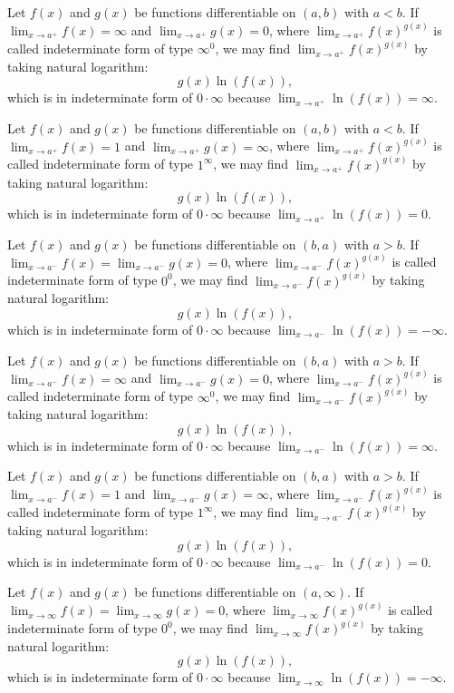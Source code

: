 \documentclass[a4paper,12pt]{report}
\begin{document}
\begin{itemize}
\begin{itemize}
Let $f(x)$ and $g(x)$ be functions differentiable on $(a,b)$ with $a<b$. If $\lim_{x\to a^+}f(x)=\infty$ and $\lim_{x\to a^+}g(x)=0$, where $\lim_{x\to a^+}f(x)^{g(x)}$ is called indeterminate form of type $\infty^0$, we may find $\lim_{x\to a^+}f(x)^{g(x)}$ by taking natural logarithm:
\[g(x)\ln(f(x)),\]
which is in indeterminate form of $0\cdot\infty$ because $\lim_{x\to a^+}\ln(f(x))=\infty$.

Let $f(x)$ and $g(x)$ be functions differentiable on $(a,b)$ with $a<b$. If $\lim_{x\to a^+}f(x)=1$ and $\lim_{x\to a^+}g(x)=\infty$, where $\lim_{x\to a^+}f(x)^{g(x)}$ is called indeterminate form of type $1^{\infty}$, we may find $\lim_{x\to a^+}f(x)^{g(x)}$ by taking natural logarithm:
\[g(x)\ln(f(x)),\]
which is in indeterminate form of $0\cdot\infty$ because $\lim_{x\to a^+}\ln(f(x))=0$.

Let $f(x)$ and $g(x)$ be functions differentiable on $(b,a)$ with $a>b$. If $\lim_{x\to a^-}f(x)=\lim_{x\to a^-}g(x)=0$, where $\lim_{x\to a^-}f(x)^{g(x)}$ is called indeterminate form of type $0^0$, we may find $\lim_{x\to a^-}f(x)^{g(x)}$ by taking natural logarithm:
\[g(x)\ln(f(x)),\]
which is in indeterminate form of $0\cdot\infty$ because $\lim_{x\to a^-}\ln(f(x))=-\infty$.

Let $f(x)$ and $g(x)$ be functions differentiable on $(b,a)$ with $a>b$. If $\lim_{x\to a^-}f(x)=\infty$ and $\lim_{x\to a^-}g(x)=0$, where $\lim_{x\to a^-}f(x)^{g(x)}$ is called indeterminate form of type $\infty^0$, we may find $\lim_{x\to a^-}f(x)^{g(x)}$ by taking natural logarithm:
\[g(x)\ln(f(x)),\]
which is in indeterminate form of $0\cdot\infty$ because $\lim_{x\to a^-}\ln(f(x))=\infty$.

Let $f(x)$ and $g(x)$ be functions differentiable on $(b,a)$ with $a>b$. If $\lim_{x\to a^-}f(x)=1$ and $\lim_{x\to a^-}g(x)=\infty$, where $\lim_{x\to a^-}f(x)^{g(x)}$ is called indeterminate form of type $1^{\infty}$, we may find $\lim_{x\to a^-}f(x)^{g(x)}$ by taking natural logarithm:
\[g(x)\ln(f(x)),\]
which is in indeterminate form of $0\cdot\infty$ because $\lim_{x\to a^-}\ln(f(x))=0$.

Let $f(x)$ and $g(x)$ be functions differentiable on $(a,\infty)$. If $\lim_{x\to\infty}f(x)=\lim_{x\to\infty}g(x)=0$, where $\lim_{x\to\infty}f(x)^{g(x)}$ is called indeterminate form of type $0^0$, we may find $\lim_{x\to\infty}f(x)^{g(x)}$ by taking natural logarithm:
\[g(x)\ln(f(x)),\]
which is in indeterminate form of $0\cdot\infty$ because $\lim_{x\to\infty}\ln(f(x))=-\infty$.


\end{itemize}
\end{itemize}
\end{document}
